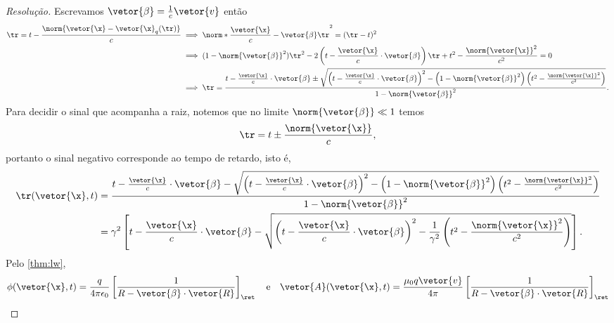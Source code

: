 \begin{proof}[Resolução]
   Escrevamos \(\vetor{\beta} = \frac1c \vetor{v}\) então
   \begin{align*}
      \tr = t - \frac{\norm{\vetor{\x} - \vetor{\x}_q(\tr)}}{c} &\implies \norm*{\frac{\vetor{\x}}{c} - \vetor{\beta}  \tr}^2 = (\tr - t)^2\\
                                                                &\implies (1 - \norm{\vetor{\beta}}^2) \tr^2 - 2 \left(t - \frac{\vetor{\x}}{c} \cdot \vetor{\beta}\right) \tr + t^2 - \frac{\norm{\vetor{\x}}^2}{c^2} = 0\\
                                                                &\implies \tr = \frac{t - \frac{\vetor{\x}}{c} \cdot \vetor{\beta} \pm \sqrt{\left(t - \frac{\vetor{\x}}{c} \cdot \vetor{\beta}\right)^2 - \left(1 - \norm{\vetor{\beta}}^2\right)\left(t^2 - \frac{\norm{\vetor{\x}}^2}{c^2}\right)}}{1 - \norm{\vetor{\beta}}^2}.
   \end{align*}
   Para decidir o sinal que acompanha a raiz, notemos que no limite \(\norm{\vetor{\beta}} \ll 1\) temos
   \begin{equation*}
      \tr = t \pm \frac{\norm{\vetor{\x}}}{c},
   \end{equation*}
   portanto o sinal negativo corresponde ao tempo de retardo, isto é,
   \begin{align*}
      \tr(\vetor{\x}, t) &= \frac{t - \frac{\vetor{\x}}{c} \cdot \vetor{\beta} - \sqrt{\left(t - \frac{\vetor{\x}}{c} \cdot \vetor{\beta}\right)^2 - \left(1 - \norm{\vetor{\beta}}^2\right)\left(t^2 - \frac{\norm{\vetor{\x}}^2}{c^2}\right)}}{1 - \norm{\vetor{\beta}}^2}\\
                         &= \gamma^2 \left[t - \frac{\vetor{\x}}{c} \cdot \vetor{\beta} - \sqrt{\left(t - \frac{\vetor{\x}}{c} \cdot \vetor{\beta}\right)^2 - \frac{1}{\gamma^2}\left(t^2 - \frac{\norm{\vetor{\x}}^2}{c^2}\right)}\right].
   \end{align*}
   Pelo \cref{thm:lw},
   \begin{equation*}
      \phi(\vetor{\x}, t) = \frac{q}{4\pi \epsilon_0}\left[\frac{1}{R - \vetor{\beta} \cdot \vetor{R}}\right]_{\ret}
      \quad\text{e}\quad
      \vetor{A}(\vetor{\x}, t) = \frac{\mu_0 q\vetor{v}}{4\pi}\left[\frac{1}{R - \vetor{\beta}\cdot \vetor{R}}\right]_{\ret}

\end{equation*}
\end{proof}
